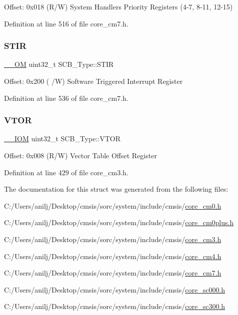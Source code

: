 Offset\+: 0x018 (R/W) System Handlers Priority Registers (4-\/7, 8-\/11, 12-\/15) 

Definition at line 516 of file core\+\_\+cm7.\+h.

\mbox{\label{struct_s_c_b___type_ad70825dd0869b7ccd07fb2b8680fcdb6}} 
\subsubsection{\texorpdfstring{S\+T\+IR}{STIR}}
{\footnotesize\ttfamily \hyperlink{core__sc300_8h_a0ea2009ed8fd9ef35b48708280fdb758}{\+\_\+\+\_\+\+OM} uint32\+\_\+t S\+C\+B\+\_\+\+Type\+::\+S\+T\+IR}

Offset\+: 0x200 ( /W) Software Triggered Interrupt Register 

Definition at line 536 of file core\+\_\+cm7.\+h.

\mbox{\label{struct_s_c_b___type_a187a4578e920544ed967f98020fb8170}} 
\subsubsection{\texorpdfstring{V\+T\+OR}{VTOR}}
{\footnotesize\ttfamily \hyperlink{core__sc300_8h_ab6caba5853a60a17e8e04499b52bf691}{\+\_\+\+\_\+\+I\+OM} uint32\+\_\+t S\+C\+B\+\_\+\+Type\+::\+V\+T\+OR}

Offset\+: 0x008 (R/W) Vector Table Offset Register 

Definition at line 429 of file core\+\_\+cm3.\+h.



The documentation for this struct was generated from the following files\+:\begin{DoxyCompactItemize}
\item 
C\+:/\+Users/anilj/\+Desktop/cmsis/sorc/system/include/cmsis/\hyperlink{core__cm0_8h}{core\+\_\+cm0.\+h}\item 
C\+:/\+Users/anilj/\+Desktop/cmsis/sorc/system/include/cmsis/\hyperlink{core__cm0plus_8h}{core\+\_\+cm0plus.\+h}\item 
C\+:/\+Users/anilj/\+Desktop/cmsis/sorc/system/include/cmsis/\hyperlink{core__cm3_8h}{core\+\_\+cm3.\+h}\item 
C\+:/\+Users/anilj/\+Desktop/cmsis/sorc/system/include/cmsis/\hyperlink{core__cm4_8h}{core\+\_\+cm4.\+h}\item 
C\+:/\+Users/anilj/\+Desktop/cmsis/sorc/system/include/cmsis/\hyperlink{core__cm7_8h}{core\+\_\+cm7.\+h}\item 
C\+:/\+Users/anilj/\+Desktop/cmsis/sorc/system/include/cmsis/\hyperlink{core__sc000_8h}{core\+\_\+sc000.\+h}\item 
C\+:/\+Users/anilj/\+Desktop/cmsis/sorc/system/include/cmsis/\hyperlink{core__sc300_8h}{core\+\_\+sc300.\+h}\end{DoxyCompactItemize}
